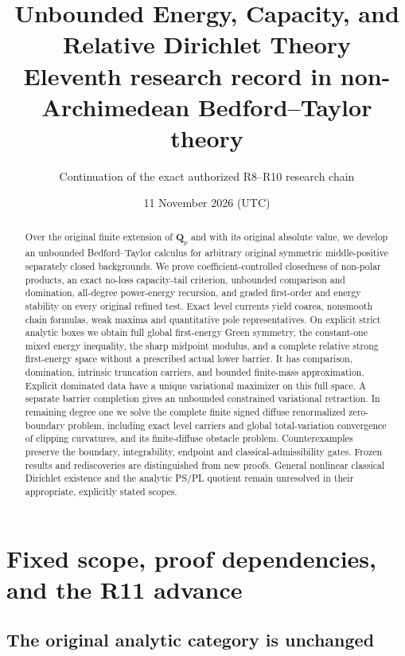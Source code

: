 \documentclass[11pt,a4paper]{article}
\title{Unbounded Energy, Capacity, and Relative Dirichlet Theory\\[5pt]
\large Eleventh research record in non-Archimedean Bedford--Taylor theory}
\author{Continuation of the exact authorized R8--R10 research chain}
\date{11 November 2026 (UTC)}
\numberwithin{equation}{section}
\theoremstyle{definition}
\theoremstyle{remark}
\begin{document}
\maketitle
\begin{abstract}
Over the original finite extension of $\mathbf Q_p$ and with its original
absolute value, we develop an unbounded Bedford--Taylor calculus for
arbitrary original symmetric middle-positive separately closed backgrounds.
We prove coefficient-controlled closedness of non-polar products, an exact
no-loss capacity-tail criterion, unbounded comparison and domination,
all-degree power-energy recursion, and graded first-order and energy
stability on every original refined test. Exact level currents yield
coarea, nonsmooth chain formulas, weak maxima and quantitative pole
representatives. On explicit strict analytic boxes we obtain full global
first-energy Green symmetry, the constant-one mixed energy inequality,
the sharp midpoint modulus, and a complete relative strong first-energy
space without a prescribed actual lower barrier. It has comparison,
domination, intrinsic truncation carriers, and bounded finite-mass
approximation. Explicit dominated data have a unique variational
maximizer on this full space. A separate barrier completion gives an
unbounded constrained variational retraction.
In remaining degree one we solve
the complete finite signed diffuse renormalized zero-boundary problem,
including exact level carriers and global total-variation convergence of
clipping curvatures, and its finite-diffuse obstacle problem. Counterexamples
preserve the boundary, integrability,
endpoint and classical-admissibility gates. Frozen results and rediscoveries
are distinguished from new proofs. General nonlinear classical Dirichlet
existence and the analytic PS/PL quotient remain unresolved in their
appropriate, explicitly stated scopes.
\end{abstract}
\tableofcontents
\newpage

\section{Fixed scope, proof dependencies, and the R11 advance}
\label{sec:r11-scope-main-results}

\subsection{The original analytic category is unchanged}
\end{document}

